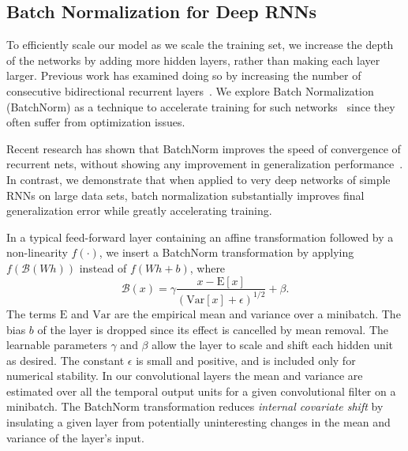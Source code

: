 \subsection{Batch Normalization for Deep RNNs}
\label{sec:deepspeech2:bn}

To efficiently scale our model as we scale the training set, we increase the
depth of the networks by adding more hidden layers, rather than making each
layer larger. Previous work has examined doing so by increasing the number of
consecutive bidirectional recurrent layers~\cite{graves2013}. We explore Batch
Normalization (BatchNorm) as a technique to accelerate training for such
networks~\cite{ioffe2015batch} since they often suffer from optimization
issues. 

Recent research has shown that BatchNorm improves the speed of convergence of
recurrent nets, without showing any improvement in generalization
performance~\cite{laurent2016}. In contrast, we demonstrate that when applied
to very deep networks of simple RNNs on large data sets, batch normalization
substantially improves final generalization error while greatly accelerating
training. 

In a typical feed-forward layer containing an affine transformation followed by
a non-linearity $f(\cdot)$, we insert a BatchNorm transformation by applying
$f(\mathcal{B}(Wh))$ instead of $f(Wh + b)$, where
\begin{equation*}
    \mathcal{B}(x) = \gamma 
        \frac{x - \mathrm{E}[x]}{\left(\mathrm{Var}[x] + \epsilon\right)^{1/2}} + \beta.
\end{equation*}
The terms $\mathrm{E}$ and $\mathrm{Var}$ are the empirical mean and variance
over a minibatch. The bias $b$ of the layer is dropped since its effect is
cancelled by mean removal. The learnable parameters $\gamma$ and $\beta$ allow
the layer to scale and shift each hidden unit as desired. The constant
$\epsilon$ is small and positive, and is included only for numerical stability.
In our convolutional layers the mean and variance are estimated over all the
temporal output units for a given convolutional filter on a minibatch. The
BatchNorm transformation reduces \emph{internal covariate shift} by insulating
a given layer from potentially uninteresting changes in the mean and variance
of the layer's input.

